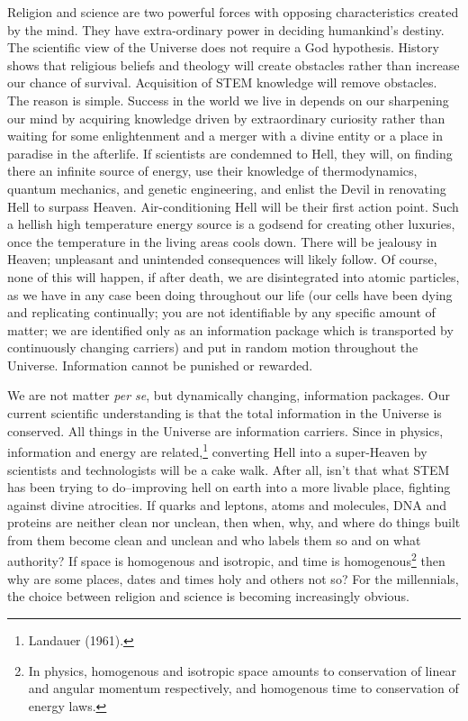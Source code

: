 \begin{multicols}{2}
Religion and science are two powerful forces with opposing characteristics created by the mind. They have extra-ordinary power in deciding humankind's destiny. The scientific view of the Universe does not require a God hypothesis. History shows that religious beliefs and theology will create obstacles rather than increase our chance of survival. Acquisition of STEM knowledge will remove obstacles. The reason is simple. Success in the world we live in depends on our sharpening our mind by acquiring knowledge driven by extraordinary curiosity rather than waiting for some enlightenment and a merger with a divine entity or a place in paradise in the afterlife. If scientists are condemned to Hell, they will, on finding there an infinite source of energy, use their knowledge of thermodynamics, quantum mechanics, and genetic engineering, and enlist the Devil in renovating Hell to surpass Heaven. Air-conditioning Hell will be their first action point. Such a hellish high temperature energy source is a godsend for creating other luxuries, once the temperature in the living areas cools down. There will be jealousy in Heaven; unpleasant and unintended consequences will likely follow. Of course, none of this will happen, if after death, we are disintegrated into atomic particles, as we have in any case been doing throughout our life (our cells have been dying and replicating continually; you are not identifiable by any specific amount of matter; we are identified only as an information package which is transported by continuously changing carriers) and put in random motion throughout the Universe. Information cannot be punished or rewarded.

We are not matter \textit{per se}, but dynamically changing, information packages. Our current scientific understanding is that the total information in the Universe is conserved. All things in the Universe are information carriers. Since in physics, information and energy are related,\footnote{Landauer (1961).} converting Hell into a super-Heaven by scientists and technologists will be a cake walk. After all, isn't that what STEM has been trying to do--improving hell on earth into a more livable place, fighting against divine atrocities. If quarks and leptons, atoms and molecules, DNA and proteins are neither clean nor unclean, then when, why, and where do things built from them become clean and unclean and who labels them so and on what authority? If space is homogenous and isotropic, and time is homogenous\footnote{In physics, homogenous and isotropic space amounts to conservation of linear and angular momentum respectively, and homogenous time to conservation of energy laws.}  then why are some places, dates and times holy and others not so? For the millennials, the choice between religion and science is becoming increasingly obvious.


\end{multicols}
